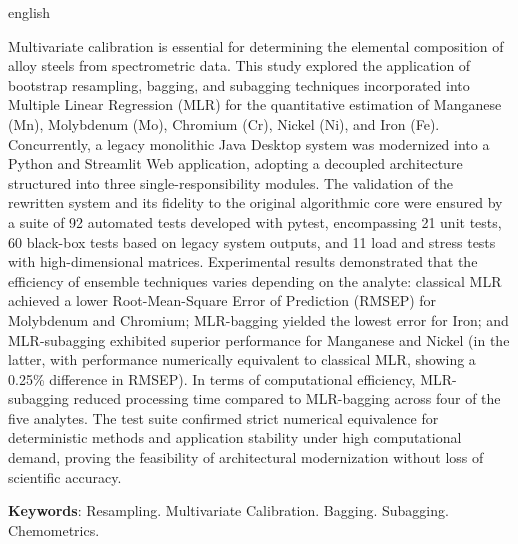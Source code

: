 \begin{resumo}[Abstract]
\SingleSpacing
\begin{otherlanguage*}{english}

Multivariate calibration is essential for determining the elemental composition of alloy steels from spectrometric data. This study explored the application of bootstrap resampling, bagging, and subagging techniques incorporated into Multiple Linear Regression (MLR) for the quantitative estimation of Manganese (Mn), Molybdenum (Mo), Chromium (Cr), Nickel (Ni), and Iron (Fe). Concurrently, a legacy monolithic Java Desktop system was modernized into a Python and Streamlit Web application, adopting a decoupled architecture structured into three single-responsibility modules. The validation of the rewritten system and its fidelity to the original algorithmic core were ensured by a suite of 92 automated tests developed with pytest, encompassing 21 unit tests, 60 black-box tests based on legacy system outputs, and 11 load and stress tests with high-dimensional matrices. Experimental results demonstrated that the efficiency of ensemble techniques varies depending on the analyte: classical MLR achieved a lower Root-Mean-Square Error of Prediction (RMSEP) for Molybdenum and Chromium; MLR-bagging yielded the lowest error for Iron; and MLR-subagging exhibited superior performance for Manganese and Nickel (in the latter, with performance numerically equivalent to classical MLR, showing a 0.25\% difference in RMSEP). In terms of computational efficiency, MLR-subagging reduced processing time compared to MLR-bagging across four of the five analytes. The test suite confirmed strict numerical equivalence for deterministic methods and application stability under high computational demand, proving the feasibility of architectural modernization without loss of scientific accuracy.%



\textbf{Keywords}: Resampling. Multivariate Calibration. Bagging. Subagging. Chemometrics.
\end{otherlanguage*}
\end{resumo}

% 
%
%  

